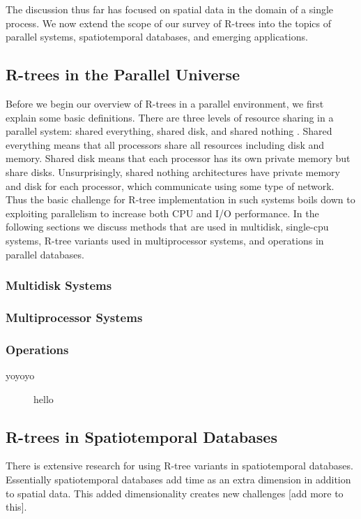 The discussion thus far has focused on spatial data in the domain of a single
process. We now extend the scope of our survey of R-trees into the topics of
parallel systems, spatiotemporal databases, and emerging applications.

\subsection{R-trees in the Parallel Universe}
Before we begin our overview of R-trees in a parallel environment, we first 
explain some basic definitions. There are three levels of resource sharing in
a parallel system: shared everything, shared disk, and shared nothing
\cite{theBook}. Shared everything means that all processors share all 
resources including disk and memory. Shared disk means that each processor 
has its own private memory but share disks. Unsurprisingly, shared nothing 
architectures have private memory and disk for each processor, which
communicate using some type of network. Thus the basic challenge for R-tree 
implementation in such systems boils down to exploiting parallelism to 
increase both CPU and I/O performance. In the following sections we discuss
methods that are used in multidisk, single-cpu systems, R-tree variants used 
in multiprocessor systems, and operations in parallel databases.

\subsubsection{Multidisk Systems}

\subsubsection{Multiprocessor Systems}

\subsubsection{Operations}

\begin{description}
	\item[yoyoyo] hello
\end{description}

\subsection{R-trees in Spatiotemporal Databases}
There is extensive research for using R-tree variants in spatiotemporal
databases. Essentially spatiotemporal databases add time as an extra dimension
in addition to spatial data. This added dimensionality creates new challenges
[add more to this]. 

